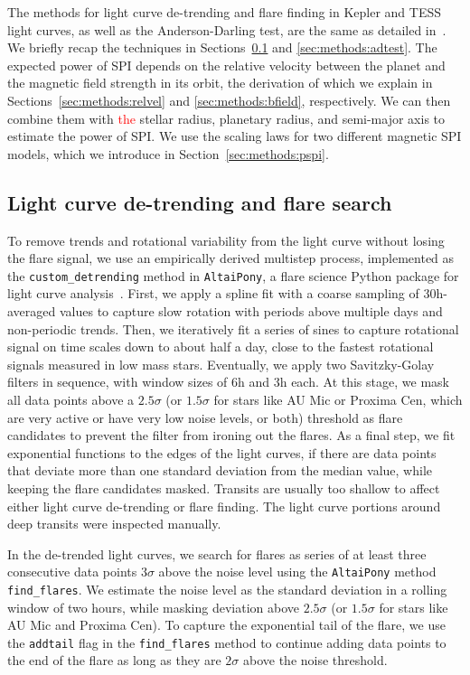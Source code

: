 \documentclass[twocolumn]{aastex631}
\begin{document}
The methods for light curve de-trending and flare finding in Kepler and TESS light curves, as well as the Anderson-Darling test, are the same as detailed in~\citet{ilin2022searching}. We briefly recap the techniques in Sections~\ref{sec:methods:flaresearch} and \ref{sec:methods:adtest}. The expected power of SPI depends on the relative velocity between the planet and the magnetic field strength in its orbit, the derivation of which we explain in 
Sections~\ref{sec:methods:relvel} and \ref{sec:methods:bfield}, respectively. We can then combine them with \textcolor{red}{the} stellar radius, planetary radius, and semi-major axis to estimate the power of SPI. We use the scaling laws for two different magnetic SPI models, which we introduce in Section~\ref{sec:methods:pspi}.

\subsection{Light curve de-trending and flare search}
\label{sec:methods:flaresearch}
To remove trends and rotational variability from the light curve without losing the flare signal, we use an empirically derived multistep process, implemented as the \texttt{custom\_detrending} method in \texttt{AltaiPony}, a flare science Python package for light curve analysis~\citep{ilin2021altaipony}. First, we apply a spline fit with a coarse sampling of 30h-averaged values to capture slow rotation with periods above multiple days and non-periodic trends. Then, we iteratively fit a series of sines to capture rotational signal on time scales down to about half a day, close to the fastest rotational signals measured in low mass stars. Eventually, we apply two Savitzky-Golay~\citep{savitzky1964smoothing} filters in sequence, with window sizes of 6h and 3h each. At this stage, we mask all data points above a $2.5 \sigma$ (or $1.5 \sigma$ for stars like AU Mic or Proxima Cen, which are very active or have very low noise levels, or both) threshold as flare candidates to prevent the filter from ironing out the flares. As a final step, we fit exponential functions to the edges of the light curves, if there are data points that deviate more than one standard deviation from the median value, while keeping the flare candidates masked. Transits are usually too shallow to affect either light curve de-trending or flare finding. The light curve portions around deep transits were inspected manually.

In the de-trended light curves, we search for flares as series of at least three consecutive data points $3\sigma$ above the noise level using the \texttt{AltaiPony} method \texttt{find\_flares}. We estimate the noise level as the standard deviation in a rolling window of two hours, while masking deviation above $2.5\sigma$ (or $1.5\sigma$  for stars like AU Mic and Proxima Cen). To capture the exponential tail of the flare, we use the \texttt{addtail} flag in the \texttt{find\_flares} method to continue adding data points to the end of the flare as long as they are $2\sigma$ above the noise threshold.
\end{document}
